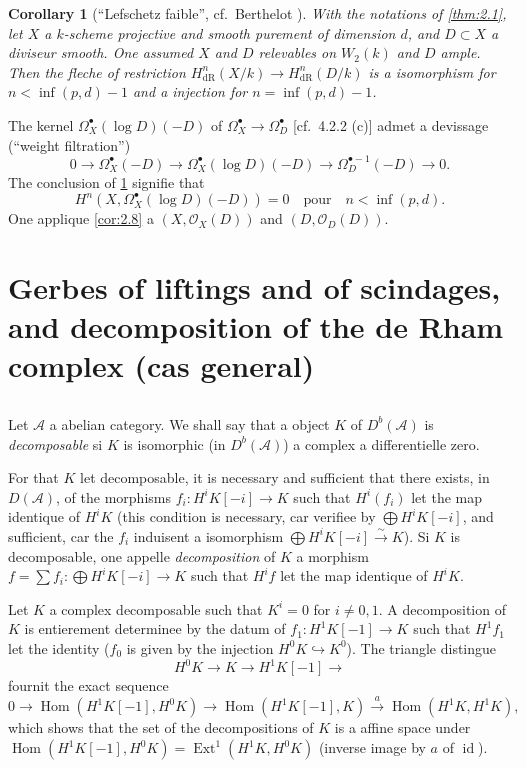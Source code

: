 \documentclass[12pt,a4paper]{article}
\theoremstyle{plain}
\newtheorem{corollary}[theorem]{Corollary}
\theoremstyle{definition}
\theoremstyle{remark}
\DeclareMathOperator{\Hom}{Hom}
\DeclareMathOperator{\Ext}{Ext}
\DeclareMathOperator{\id}{id}
\newcommand{\cO}{\mathcal{O}}
\newcommand{\dR}{\text{dR}}
\begin{document}
\begin{corollary}[``Lefschetz faible'', cf.~Berthelot {\cite{2}}]\label{cor:2.12}
With the notations of \ref{thm:2.1}, let $X$ a $k$-scheme projective and smooth purement of dimension $d$, and $D \subset X$ a diviseur smooth. One assumed $X$ and $D$ relevables on $W_2(k)$ and $D$ ample. Then the fleche of restriction $H^n_{\dR}(X/k) \to H^n_{\dR}(D/k)$ is a isomorphism for $n < \inf(p, d) - 1$ and a injection for $n = \inf(p, d) - 1$.
\end{corollary}

The kernel $\Omega^{\bullet}_X(\log D)(-D)$ of $\Omega^{\bullet}_X \to \Omega^{\bullet}_D$ [cf.~4.2.2 (c)] admet a devissage (``weight filtration'')
\[
0 \to \Omega^{\bullet}_X(-D) \to \Omega^{\bullet}_X(\log D)(-D) \to \Omega^{\bullet-1}_D(-D) \to 0.
\]
The conclusion of \ref{cor:2.12} signifie that
\[
H^n(X, \Omega^{\bullet}_X(\log D)(-D)) = 0 \quad \text{pour} \quad n < \inf(p, d).
\]
One applique \ref{cor:2.8} a $(X, \cO_X(D))$ and $(D, \cO_D(D))$.

\section{Gerbes of liftings and of scindages, and decomposition of the de Rham complex (cas general)}

\subsection{}

Let $\mathcal{A}$ a abelian category. We shall say that a object $K$ of $D^b(\mathcal{A})$ is \emph{decomposable} si $K$ is isomorphic (in $D^b(\mathcal{A})$) a complex a differentielle zero.

For that $K$ let decomposable, it is necessary and sufficient that there exists, in $D(\mathcal{A})$, of the morphisms $f_i: H^i K[-i] \to K$ such that $H^i(f_i)$ let the map identique of $H^i K$ (this condition is necessary, car verifiee by $\bigoplus H^i K[-i]$, and sufficient, car the $f_i$ induisent a isomorphism $\bigoplus H^i K[-i] \xrightarrow{\sim} K$). Si $K$ is decomposable, one appelle \emph{decomposition} of $K$ a morphism $f = \sum f_i: \bigoplus H^i K[-i] \to K$ such that $H^i f$ let the map identique of $H^i K$.

Let $K$ a complex decomposable such that $K^i = 0$ for $i \neq 0, 1$. A decomposition of $K$ is entierement determinee by the datum of $f_1: H^1 K[-1] \to K$ such that $H^1 f_1$ let the identity ($f_0$ is given by the injection $H^0 K \hookrightarrow K^0$). The triangle distingue
\[
H^0 K \to K \to H^1 K[-1] \to
\]
fournit the exact sequence
\[
0 \to \Hom(H^1 K[-1], H^0 K) \to \Hom(H^1 K[-1], K) \xrightarrow{a} \Hom(H^1 K, H^1 K),
\]
which shows that the set of the decompositions of $K$ is a affine space under $\Hom(H^1 K[-1], H^0 K) = \Ext^1(H^1 K, H^0 K)$ (inverse image by $a$ of $\id$).
\end{document}
